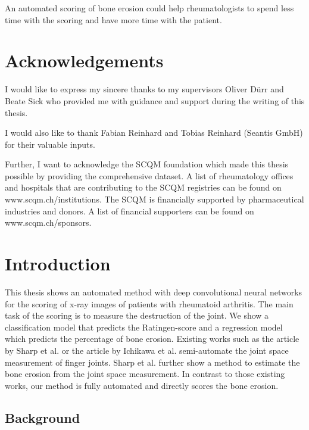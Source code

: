 \documentclass[12pt]{article}
\begin{document}
An automated scoring of bone erosion could help rheumatologists to spend less time with the scoring and have more time with the patient.

\newpage

\section*{Acknowledgements}
I would like to express my sincere thanks to my supervisors Oliver Dürr and Beate Sick who provided me with guidance and support during the writing of this thesis. 

I would also like to thank Fabian Reinhard and Tobias Reinhard (Seantis GmbH) for their valuable inputs. 

Further, I want to acknowledge the SCQM foundation which made this thesis possible by providing the comprehensive dataset. A list of rheumatology offices and hospitals that are contributing to the SCQM registries can be found on www.scqm.ch/institutions. The SCQM is financially supported by pharmaceutical industries and donors. A list of financial supporters can be found on www.scqm.ch/sponsors.

\newpage

\tableofcontents

\newpage

\section{Introduction}

This thesis shows an automated method with deep convolutional neural networks for the scoring of x-ray images of patients with rheumatoid arthritis. The main task of the scoring is to measure the destruction of the joint. \cite{rau_2007} We show a classification model that predicts the Ratingen-score and a regression model which predicts the percentage of bone erosion. Existing works such as the article by Sharp et al. \cite{sharp_2000} or the article by Ichikawa et al.\cite{ichikawa_2017} semi-automate the joint space measurement of finger joints. Sharp et al. further show a method to estimate the bone erosion from the joint space measurement. In contrast to those existing works, our method is fully automated and directly scores the bone erosion.

\subsection{Background}
\end{document}
